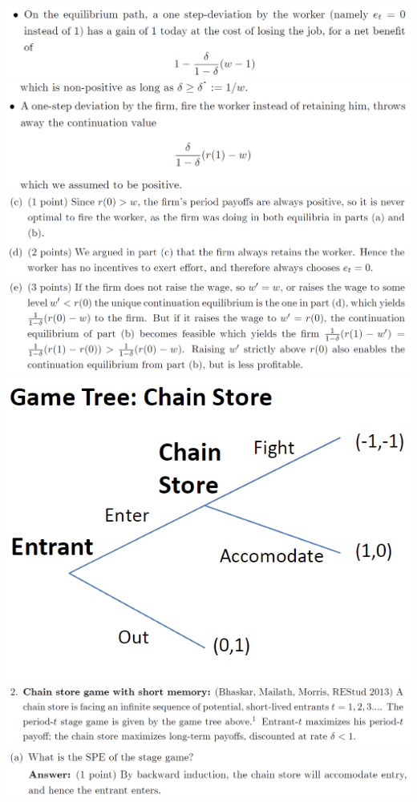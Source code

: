 \documentclass[8pt,landscape]{extarticle}
\begin{document}
\begin{multicols*}{3}
    \includegraphics[width=0.89\linewidth,keepaspectratio]{Screenshots/Screenshot 2024-03-15 093814.png}
    \includegraphics[width=0.88\linewidth,keepaspectratio]{Screenshots/Screenshot 2024-03-15 093820.png}
    \includegraphics[width=0.95\linewidth,keepaspectratio]{Screenshots/Screenshot 2024-03-15 093827.png}
    \includegraphics[width=0.95\linewidth,keepaspectratio]{Screenshots/Screenshot 2024-03-15 093832.png}
    \includegraphics[width=0.41\linewidth,keepaspectratio]{Screenshots/Screenshot 2024-03-15 093850.png}
    \includegraphics[width=1.0\linewidth,keepaspectratio]{Screenshots/Screenshot 2024-03-15 093855.png}
    \includegraphics[width=0.95\linewidth,keepaspectratio]{Screenshots/Screenshot 2024-03-15 093901.png}

\end{multicols*}
\end{document}
